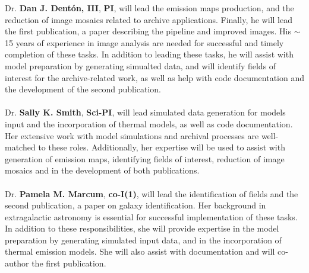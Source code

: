 Dr. \textbf{Dan J. Dent{\'{o}}n, III}, \textbf{PI}, will lead the emission maps production, and the reduction of image mosaics related to archive applications. Finally, he will lead the first publication, a paper describing the pipeline and improved images.  His $\sim$15 years of experience in image analysis are needed for successful and timely completion of these tasks. In addition to leading these tasks, he will assist with model preparation by generating simualted data, and will identify fields of interest for the archive-related work, as well as help with code documentation and the development of the second publication. \\ \\
Dr. \textbf{Sally K. Smith}, \textbf{Sci-PI}, will lead simulated data generation for models input and the incorporation of thermal models, as well as code documentation.  Her extensive work with model simulations and archival processes are well-matched to these roles.  Additionally, her expertise will be used to assist with generation of emission maps, identifying fields of interest, reduction of image mosaics and in the development of both publications. \\ \\
Dr. \textbf{Pamela M. Marcum}, \textbf{co-I(1)}, will lead the identification of fields and the second publication, a paper on galaxy identification.  Her background in extragalactic astronomy is essential for successful implementation of these tasks. In addition to these responsibilities, she will provide expertise in the model preparation by generating simulated input data, and in the incorporation of thermal emission models.  She will also assist with documentation and will co-author the first publication. \\ 